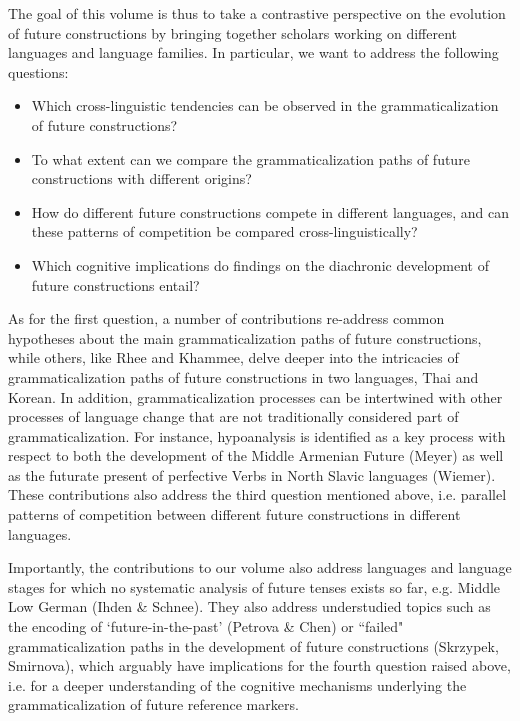 \documentclass[output=paper,colorlinks,citecolor=brown]{langscibook}
\begin{document}
The goal of this volume is thus to take a contrastive perspective on the evolution of future constructions by bringing together scholars working on different languages and language families. In particular, we want to address the following questions:

 \begin{itemize}
     \item Which cross-linguistic tendencies can be observed in the grammaticalization of future constructions?
     \item To what extent can we compare the grammaticalization paths of future constructions with different origins?
     \item How do different future constructions compete in different languages, and can these patterns of competition be compared cross-linguistically?
     \item Which cognitive implications do findings on the diachronic development of future constructions entail?
 \end{itemize}

As for the first question, a number of contributions re-address common hypotheses about the main grammaticalization paths of future constructions, while others, like Rhee and Khammee, delve deeper into the intricacies of grammaticalization paths of future constructions in two languages, Thai and Korean. In addition, grammaticalization processes can be intertwined with other processes of language change that are not traditionally considered part of grammaticalization. For instance, hypoanalysis is identified as a key process with respect to both the development of the Middle Armenian Future (Meyer) as well as the futurate present of perfective Verbs in North Slavic languages (Wiemer). These contributions also address the third question mentioned above, i.e. parallel patterns of competition between different future constructions in different languages. 

Importantly, the contributions to our volume also address languages and language stages for which no systematic analysis of future tenses exists so far, e.g. Middle Low German (Ihden \& Schnee). They also address understudied topics such as the encoding of ‘future-in-the-past’ (Petrova \& Chen) or ``failed" grammaticalization paths in the development of future constructions (Skrzypek, Smirnova), which arguably have implications for the fourth question raised above, i.e. for a deeper understanding of the cognitive mechanisms underlying the grammaticalization of future reference markers.
\end{document}
